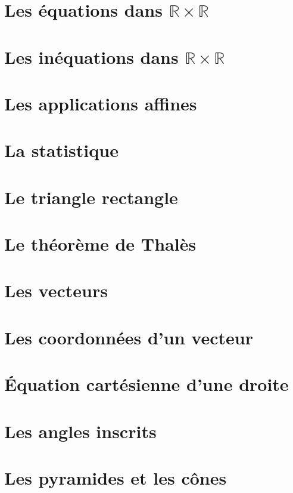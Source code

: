\documentclass[12pt,a4paper]{book}
\begin{document}
\chapter{Les équations dans $\mathbb{R} \times \mathbb{R}$}
\chapter{Les inéquations dans $\mathbb{R} \times \mathbb{R}$}
\chapter{Les applications affines}
\chapter{La statistique}
\chapter{Le triangle rectangle}
\chapter{Le théorème de Thalès}
\chapter{Les vecteurs}
\chapter{Les coordonnées d'un vecteur}
\chapter{Équation cartésienne d'une droite}
\chapter{Les angles inscrits}
\chapter{Les pyramides et les cônes}
\end{document}
